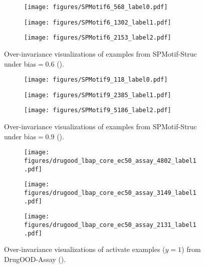 \begin{figure}[h]
    \centering
    \begin{subfigure}{0.31\textwidth}
        \centering
        \texttt{[image: figures/SPMotif6\_568\_label0.pdf]}
    \end{subfigure}
    \begin{subfigure}{0.31\textwidth}
        \centering
        \texttt{[image: figures/SPMotif6\_1302\_label1.pdf]}
    \end{subfigure}
    \begin{subfigure}{0.31\textwidth}
        \centering
        \texttt{[image: figures/SPMotif6\_2153\_label2.pdf]}
    \end{subfigure}
    \caption{Over-invariance visualizations of examples from SPMotif-Struc under bias$=0.6$ (\cite{ciga}).}
    \label{fig:spmotif_b6_appdx}
\end{figure}

\begin{figure}[h]
    \centering
    \begin{subfigure}{0.31\textwidth}
        \centering
        \texttt{[image: figures/SPMotif9\_118\_label0.pdf]}
    \end{subfigure}
    \begin{subfigure}{0.31\textwidth}
        \centering
        \texttt{[image: figures/SPMotif9\_2385\_label1.pdf]}
    \end{subfigure}
    \begin{subfigure}{0.31\textwidth}
        \centering
        \texttt{[image: figures/SPMotif9\_5186\_label2.pdf]}
    \end{subfigure}
    \caption{Over-invariance visualizations of examples from SPMotif-Struc under bias$=0.9$ (\cite{ciga}).}
    \label{fig:spmotif_b9_appdx}
\end{figure}

\begin{figure}[h]
    \centering
    \begin{subfigure}{0.31\textwidth}
        \centering
        \texttt{[image: figures/drugood\_lbap\_core\_ec50\_assay\_4802\_label1.pdf]}
    \end{subfigure}
    \begin{subfigure}{0.31\textwidth}
        \centering
        \texttt{[image: figures/drugood\_lbap\_core\_ec50\_assay\_3149\_label1.pdf]}
    \end{subfigure}
    \begin{subfigure}{0.31\textwidth}
        \centering
        \texttt{[image: figures/drugood\_lbap\_core\_ec50\_assay\_2131\_label1.pdf]}
    \end{subfigure}
    \caption{Over-invariance visualizations of activate examples ($y=1$) from DrugOOD-Assay (\cite{ciga}).}
    \label{fig:assay_viz_act_appdx}
\end{figure}

